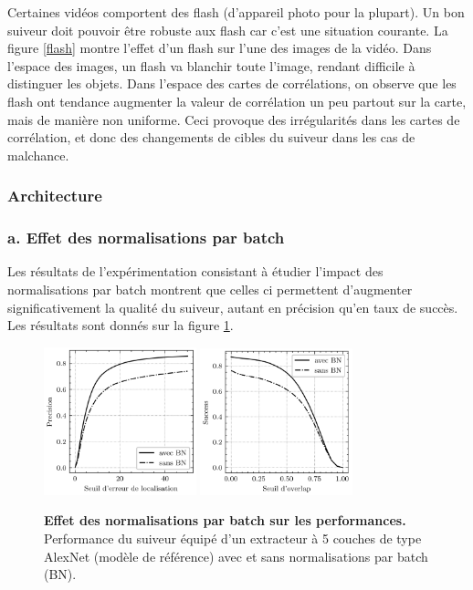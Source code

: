 \documentclass[10pt,twocolumn,letterpaper,french]{article}
\begin{document}
Certaines vidéos comportent des flash (d'appareil photo pour la plupart). Un bon suiveur doit pouvoir être robuste aux flash car c'est une situation courante. La figure \ref{flash} montre l'effet d'un flash sur l'une des images de la vidéo. Dans l'espace des images, un flash va blanchir toute l'image, rendant difficile à distinguer les objets. Dans l'espace des cartes de corrélations, on observe que les flash ont tendance augmenter la valeur de corrélation un peu partout sur la carte, mais de manière non uniforme. Ceci provoque des  irrégularités dans les cartes de corrélation, et donc des changements de cibles du suiveur dans les cas de malchance.


\subsubsection*{Architecture}

\subsubsection*{a. Effet des normalisations par batch}

Les résultats de l'expérimentation consistant à étudier l'impact des normalisations par batch montrent que celles ci permettent d'augmenter significativement la qualité du suiveur, autant en précision qu'en taux de succès. Les résultats sont donnés sur la figure \ref{courbes_BN}.


\begin{figure}[h!]
\centering
\includegraphics[width=125pt]{images/BN/courbes_pre.png} 
\includegraphics[width=125pt]{images/BN/courbes_succ.png} 
\caption{\textbf{Effet des normalisations par batch sur les performances.} Performance du suiveur équipé d'un extracteur à 5 couches de type AlexNet (modèle de référence) avec et sans normalisations par batch (BN).}
\label{courbes_BN}
\end{figure}
\end{document}
